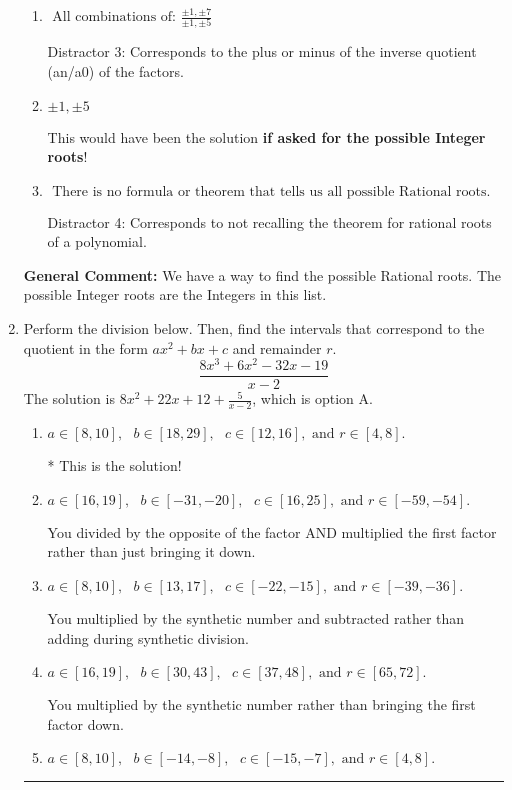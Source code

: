 \documentclass{extbook}[14pt]
\newcommand{\litem}[1]{\item #1

\rule{\textwidth}{0.4pt}}
\begin{document}
\begin{enumerate}
{\begin{enumerate}[label=\Alph*.]
* This is the solution \textbf{since we asked for the possible Rational roots}!
\item \( \text{ All combinations of: }\frac{\pm 1,\pm 7}{\pm 1,\pm 5} \)

 Distractor 3: Corresponds to the plus or minus of the inverse quotient (an/a0) of the factors. 
\item \( \pm 1,\pm 5 \)

This would have been the solution \textbf{if asked for the possible Integer roots}!
\item \( \text{ There is no formula or theorem that tells us all possible Rational roots.} \)

 Distractor 4: Corresponds to not recalling the theorem for rational roots of a polynomial.
\end{enumerate}

\textbf{General Comment:} We have a way to find the possible Rational roots. The possible Integer roots are the Integers in this list.
}
\litem{
Perform the division below. Then, find the intervals that correspond to the quotient in the form $ax^2+bx+c$ and remainder $r$.
\[ \frac{8x^{3} +6 x^{2} -32 x -19}{x -2} \]The solution is \( 8x^{2} +22 x + 12 + \frac{5}{x -2} \), which is option A.\begin{enumerate}[label=\Alph*.]
\item \( a \in [8, 10], \text{   } b \in [18, 29], \text{   } c \in [12, 16], \text{   and   } r \in [4, 8]. \)

* This is the solution!
\item \( a \in [16, 19], \text{   } b \in [-31, -20], \text{   } c \in [16, 25], \text{   and   } r \in [-59, -54]. \)

 You divided by the opposite of the factor AND multiplied the first factor rather than just bringing it down.
\item \( a \in [8, 10], \text{   } b \in [13, 17], \text{   } c \in [-22, -15], \text{   and   } r \in [-39, -36]. \)

 You multiplied by the synthetic number and subtracted rather than adding during synthetic division.
\item \( a \in [16, 19], \text{   } b \in [30, 43], \text{   } c \in [37, 48], \text{   and   } r \in [65, 72]. \)

 You multiplied by the synthetic number rather than bringing the first factor down.
\item \( a \in [8, 10], \text{   } b \in [-14, -8], \text{   } c \in [-15, -7], \text{   and   } r \in [4, 8]. \)


\end{enumerate}}
\end{enumerate}
\end{document}
